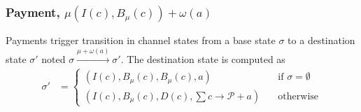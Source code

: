 \documentclass{llncs}
\begin{document}
\subsubsection{Payment, $\mu(I(c), B_\mu(c))+\omega(a)$} Payments trigger transition in channel states from a base state $\sigma$ to a destination state $\sigma'$ noted $\sigma \xrightarrow{\mu + \omega(a)} \sigma'$.
The destination state is computed as
\begin{equation*}
\begin{split}
  \sigma' &=
  \begin{cases}
      (I(c), B_\mu(c), B_\mu(c), a) & \quad \text{if } \sigma = \emptyset \\
      (I(c), B_\mu(c), D(c), \textstyle \sum c \rightarrow \mathcal{P}+a) & \quad \text{otherwise}
  \end{cases}
\end{split}
\end{equation*}
\end{document}
